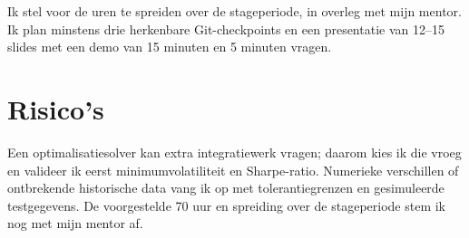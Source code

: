 Ik stel voor de uren te spreiden over de stageperiode, in overleg met mijn
mentor. Ik plan minstens drie herkenbare Git-checkpoints en een presentatie
van 12--15 slides met een demo van 15 minuten en 5 minuten vragen.


\section{Risico's}%
\label{vst:risicos}

%

Een optimalisatiesolver kan extra integratiewerk vragen; daarom kies ik die
vroeg en valideer ik eerst minimumvolatiliteit en Sharpe-ratio. Numerieke
verschillen of ontbrekende historische data vang ik op met tolerantiegrenzen en
gesimuleerde testgegevens. De voorgestelde 70 uur en spreiding over de
stageperiode stem ik nog met mijn mentor af.
